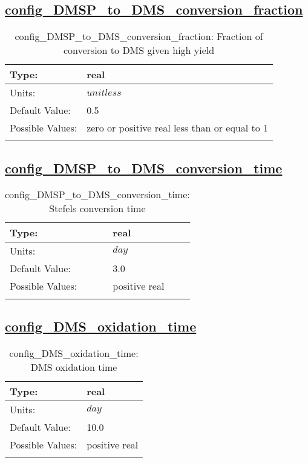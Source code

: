 \subsection[config\_DMSP\_to\_DMS\_conversion\_fraction]{\hyperref[sec:nm_tab_biogeochemistry]{config\_DMSP\_to\_DMS\_conversion\_fraction}}
\label{subsec:nm_sec_config_DMSP_to_DMS_conversion_fraction}
\begin{center}
\begin{longtable}{| p{2.0in} || p{4.0in} |}
    \hline
    Type: & real \\
    \hline
    Units: & $unitless$ \\
    \hline
    Default Value: & 0.5 \\
    \hline
    Possible Values: & zero or positive real less than or equal to 1 \\
    \hline
    \caption{config\_DMSP\_to\_DMS\_conversion\_fraction: Fraction of conversion to DMS given high yield}
\end{longtable}
\end{center}
\subsection[config\_DMSP\_to\_DMS\_conversion\_time]{\hyperref[sec:nm_tab_biogeochemistry]{config\_DMSP\_to\_DMS\_conversion\_time}}
\label{subsec:nm_sec_config_DMSP_to_DMS_conversion_time}
\begin{center}
\begin{longtable}{| p{2.0in} || p{4.0in} |}
    \hline
    Type: & real \\
    \hline
    Units: & $day$ \\
    \hline
    Default Value: & 3.0 \\
    \hline
    Possible Values: & positive real \\
    \hline
    \caption{config\_DMSP\_to\_DMS\_conversion\_time: Stefels conversion time}
\end{longtable}
\end{center}
\subsection[config\_DMS\_oxidation\_time]{\hyperref[sec:nm_tab_biogeochemistry]{config\_DMS\_oxidation\_time}}
\label{subsec:nm_sec_config_DMS_oxidation_time}
\begin{center}
\begin{longtable}{| p{2.0in} || p{4.0in} |}
    \hline
    Type: & real \\
    \hline
    Units: & $day$ \\
    \hline
    Default Value: & 10.0 \\
    \hline
    Possible Values: & positive real \\
    \hline
    \caption{config\_DMS\_oxidation\_time: DMS oxidation time}
\end{longtable}
\end{center}
